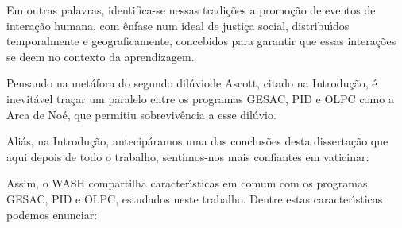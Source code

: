 \documentclass[
12pt,		%
openright,	%
twoside,  %
a4paper,			%
chapter=TITLE,		%
english,			%
french,				%
spanish,			%
brazil				%
]{USPSC-classe/USPSC}
\begin{document}
Em outras palavras, identifica-se nessas tradi\c{c}\~oes a promo\c{c}\~ao de eventos de intera\c{c}\~ao humana, com \^enfase num ideal de justi\c{c}a social, distribu\'{\i}dos temporalmente e geograficamente, concebidos para garantir que essas intera\c{c}\~oes se deem no contexto da aprendizagem.

















Pensando na met\'afora do \textquotedbl segundo dil\'uvio\textquotedbl  de Ascott, citado na Introdu\c{c}\~ao, \'e inevit\'avel tra\c{c}ar um paralelo entre os programas GESAC, PID e OLPC como a \textquotedbl Arca de No\'e\textquotedbl , que permitiu sobreviv\^encia a esse \textquotedbl dil\'uvio\textquotedbl .

















Ali\'as, na Introdu\c{c}\~ao, antecip\'aramos uma das conclus\~oes desta disserta\c{c}\~ao que aqui depois de todo o trabalho,  sentimos-nos mais confiantes em vaticinar:


















\noindent\begin{center}\mbox{\centering{}}\end{center}


Assim,  o WASH compartilha caracter\'{\i}sticas em comum com os programas GESAC, PID e OLPC, estudados neste trabalho. Dentre estas caracter\'{\i}sticas podemos enunciar:
\end{document}
